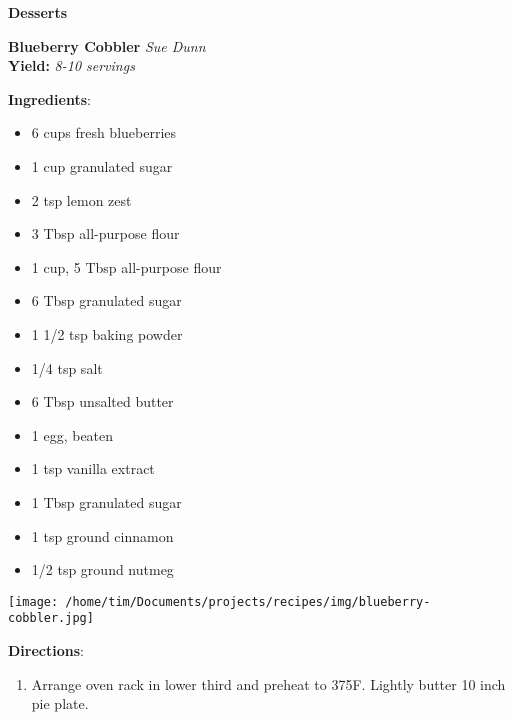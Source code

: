 \documentclass[11pt, twoside, openany]{book}
\begin{document}
{\newpage \LARGE \textbf{Desserts}} \label{desserts}\vspace{4mm}\\
\noindent\begin{minipage}[t]{\linewidth}%
{\Large\textbf{Blueberry Cobbler}} \label{blueberry-cobbler}\hfill\textit{Sue Dunn}\\
\textbf{Yield:} \textit{8-10 servings}\\
\noindent\begin{minipage}[t]{0.78\linewidth}%
\textbf{Ingredients}:\vspace{-3mm}
\begin{multicols}{2}
\begin{itemize}\setlength\itemsep{-1mm}
\item 6 cups fresh blueberries
\item 1 cup granulated sugar
\item 2 tsp lemon zest
\item 3 Tbsp all-purpose flour
\item 1 cup, 5 Tbsp all-purpose flour
\item 6 Tbsp granulated sugar
\item 1 1/2 tsp baking powder
\item 1/4 tsp salt
\item 6 Tbsp unsalted butter
\item 1 egg, beaten
\item 1 tsp vanilla extract
\item 1 Tbsp granulated sugar
\item 1 tsp ground cinnamon
\item 1/2 tsp ground nutmeg
\end{itemize}
\end{multicols}
\end{minipage}
\noindent\begin{minipage}[t]{0.18\linewidth}
\centering \strut\vspace*{-\baselineskip}\newline
\texttt{[image: /home/tim/Documents/projects/recipes/img/blueberry-cobbler.jpg]}\\
\end{minipage}\vspace{3mm}
\textbf{Directions}:
\vspace{-3mm}\begin{enumerate}\setlength\itemsep{-1mm}
\item Arrange oven rack in lower third and preheat to 375F. Lightly butter 10 inch pie plate.

\end{enumerate}
\end{minipage}
\end{document}
